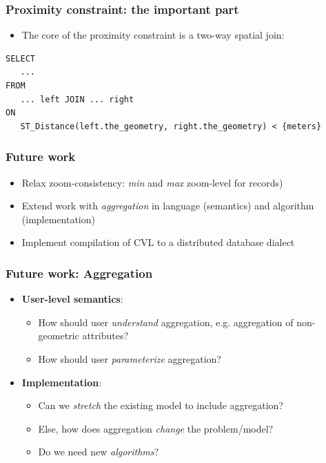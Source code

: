 \documentclass{beamer}
\begin{document}
\begin{frame}[fragile]
\frametitle{Proximity constraint: the important part}
\begin{itemize}
\item The core of the proximity constraint is a two-way spatial join:
\end{itemize}
\begin{lstlisting}
SELECT
   ...
FROM 
   ... left JOIN ... right
ON 
   ST_Distance(left.the_geometry, right.the_geometry) < {meters}
\end{lstlisting}
\end{frame}





\frame
{
  \frametitle{Future work}
  \begin{itemize}
  \item Relax zoom-consistency: \emph{min} and \emph{max} zoom-level for records)
  \item Extend work with \emph{aggregation} in language (semantics) and algorithm (implementation)
  \item Implement compilation of CVL to a distributed database dialect
  \end{itemize}
}

\frame
{
  \frametitle{Future work: Aggregation}
  \begin{center}
  \end{center}

  \begin{itemize}
  \item \textbf{User-level semantics}:
  \begin{itemize}
  \item How should user \emph{understand} aggregation, e.g. aggregation of non-geometric attributes?
  \item How should user \emph{parameterize} aggregation?
  \end{itemize}
  \item \textbf{Implementation}:
  \begin{itemize}
  \item Can we \emph{stretch} the existing model to include aggregation?
  \item Else, how does aggregation \emph{change} the problem/model?
  \item Do we need new \emph{algorithms}?
  \end{itemize}
  \end{itemize}

  \begin{center}
  \end{center}

}
\end{document}

